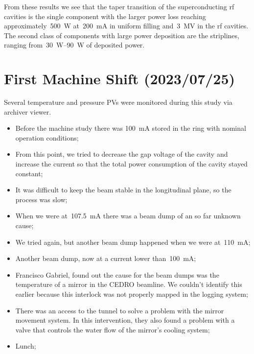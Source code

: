 \documentclass[a4paper,
               biblatex,     %
               ]{jacow}
\begin{document}
From these results we see that the taper transition of the superconducting rf cavities is the single component with the larger power loss reaching approximately~\SI{500}{\watt} at~\SI{200}{\milli\ampere} in uniform filling and~\SI{3}{\mega\volt} in the rf cavities. The second class of components with large power deposition are the striplines, ranging from~\SIrange{30}{90}{\watt} of deposited power.

\section{First Machine Shift (2023/07/25)}

Several temperature and pressure PVs were monitored during this study via archiver viewer.

\begin{itemize}
    \item Before the machine study there was \SI{100}{\milli\ampere} stored in the ring with nominal operation conditions;
    \item From this point, we tried to decrease the gap voltage of the cavity and increase the current so that the total power consumption of the cavity stayed constant;
    \item It was difficult to keep the beam stable in the longitudinal plane, so the process was slow;
    \item When we were at~\SI{107.5}{\milli\ampere} there was a beam dump of an so far unknown cause;
    \item We tried again, but another beam dump happened when we were at~\SI{110}{\milli\ampere};
    \item Another beam dump, now at a current lower than~\SI{100}{\milli\ampere};
    \item Francisco Gabriel, found out the cause for the beam dumps was the temperature of a mirror in the CEDRO beamline. We couldn't identify this earlier because this interlock was not properly mapped in the logging system;
    \item There was an access to the tunnel to solve a problem with the mirror movement system. In this intervention, they also found a problem with a valve that controls the water flow of the mirror's cooling system;
    \item Lunch;
\end{itemize}
\end{document}
